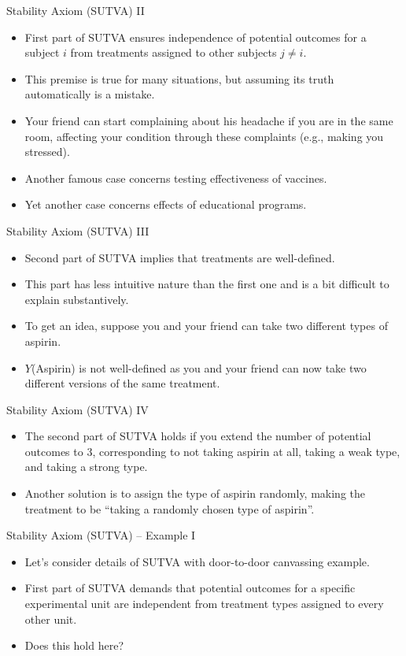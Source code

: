 \documentclass{beamer}
\begin{document}
\begin{frame}{Stability Axiom (SUTVA) II}
\begin{itemize}
	\item First part of SUTVA ensures independence of potential outcomes for a subject $i$ from treatments assigned to other subjects $j \neq i$. 
	\item This premise is true for many situations, but assuming its truth automatically is a mistake. 
	\item Your friend can start complaining about his headache if you are in the same room, affecting your condition through these complaints (e.g., making you stressed).
	\item Another famous case concerns testing effectiveness of vaccines. 
	\item Yet another case concerns effects of educational programs.
\end{itemize}
\end{frame}
\begin{frame}{Stability Axiom (SUTVA) III}
\begin{itemize}
	\setlength\itemsep{1em}
	\item Second part of SUTVA implies that treatments are well-defined. 
	\item This part has less intuitive nature than the first one and is a bit difficult to explain substantively. 
	\item To get an idea, suppose you and your friend can take two different types of aspirin. 
	\item $Y$(Aspirin) is not well-defined as you and your friend can now take two different versions of the same treatment.
\end{itemize}
\end{frame}
\begin{frame}{Stability Axiom (SUTVA) IV}
\begin{itemize}
	\setlength\itemsep{3em}
	\item The second part of SUTVA holds if you extend the number of potential outcomes to 3, corresponding to not taking aspirin at all, taking a weak type, and taking a strong type. 
	\item Another solution is to assign the type of aspirin randomly, making the treatment to be ``taking a randomly chosen type of aspirin''. 
\end{itemize}
\end{frame}
\begin{frame}{Stability Axiom (SUTVA) -- Example I}
\begin{itemize}
	\setlength\itemsep{2em}
	\item Let's consider details of SUTVA with door-to-door canvassing example. 
	\item First part of SUTVA demands that potential outcomes for a specific experimental unit are independent from treatment types assigned to every other unit. 
	\item Does this hold here? 
\end{itemize}
\end{frame}
\end{document}
